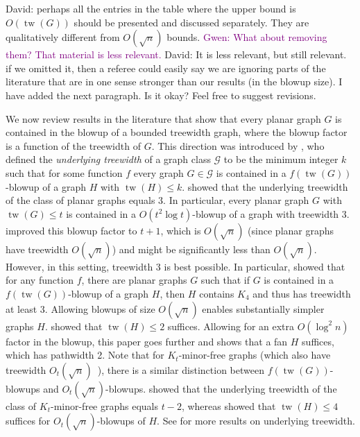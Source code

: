 \documentclass{patmorin}
\renewcommand{\leq}{\leqslant}
\newcommand{\david}[1]{{\color{orange} David: #1}}
\newcommand{\gwen}[1]{\textcolor{Purple}{Gwen: #1}}
\newcommand{\defin}[1]{\emph{\textcolor{brightmaroon}{#1}}}
\DeclareMathOperator{\tw}{tw}
\newcommand{\GG}{\mathcal{G}}
\begin{document}
\david{perhaps all the entries in the table where the upper bound is $O(\tw(G))$ should be presented and discussed separately. They are qualitatively different from $O(\sqrt{n})$ bounds.}
\gwen{What about removing them? That material is less relevant.} \david{It is less relevant, but still relevant. if we omitted it, then a referee could easily say we are ignoring parts of the literature that are in one sense stronger than our results (in the blowup size). I have added the next paragraph. Is it okay? Feel free to suggest revisions.}


We now review results in the literature that show that every planar graph $G$ is contained in the blowup of a bounded treewidth graph, where the blowup factor is a function of the treewidth of $G$. This direction was introduced by \citet{UTW}, who defined the \defin{underlying treewidth} of a graph class $\GG$ to be the minimum integer $k$ such that for some function $f$ every graph $G\in\GG$ is contained in a $f(\tw(G))$-blowup of a graph $H$ with $\tw(H)\leq k$. \citet{UTW} showed that the underlying treewidth of the class of planar graphs equals 3. In particular, every planar graph $G$ with $\tw(G)\leq t$ is contained in a $O(t^2\log t)$-blowup of a graph with treewidth 3. \citet{ISW} improved this blowup factor to $t+1$, which is $O(\sqrt{n})$ (since planar graphs have treewidth $O(\sqrt{n})$) and might be significantly less than $O(\sqrt{n})$.  However, in this setting, treewidth 3 is best possible. In particular, \citet{UTW} showed that for any function $f$, there are planar graphs $G$ such that if $G$ is contained in a $f(\tw(G))$-blowup of a graph $H$, then $H$ contains $K_4$ and thus has treewidth at least 3. Allowing blowups of size $O(\sqrt{n})$ enables substantially simpler graphs $H$. \citet{distel.dujmovic.ea:product} showed that $\tw(H)\leq 2$ suffices. Allowing for an extra $O(\log^2n)$ factor in the blowup, this paper goes further and shows that a fan $H$ suffices, which has pathwidth 2. Note that for $K_t$-minor-free graphs (which also have treewidth $O_t(\sqrt{n})$~\citep{AST90}), there is a similar distinction between $f(\tw(G))$-blowups and $O_t(\sqrt{n})$-blowups. \citet{UTW} showed that the underlying treewidth of the class of $K_t$-minor-free graphs equals $t-2$, whereas
\citet{distel.dujmovic.ea:product} showed that $\tw(H)\leq 4$ suffices for $O_t(\sqrt{n})$-blowups of $H$. See \citep{DHHJLMMRW} for more results on underlying treewidth.
\end{document}
